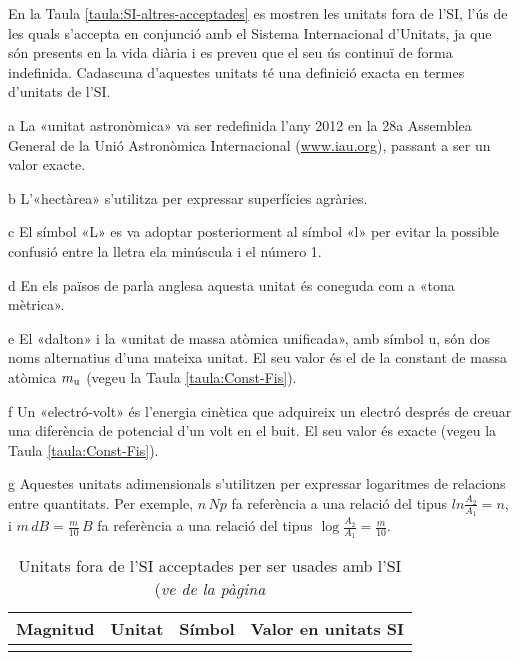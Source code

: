 En la Taula \vref{taula:SI-altres-acceptades} es mostren les unitats fora de l'SI, l'ús de les quals s'accepta en conjunció amb el Sistema Internacional d'Unitats, ja que són presents en la vida diària i es preveu que el seu ús continuï de forma indefinida. Cadascuna d'aquestes unitats té una definició exacta en termes d'unitats de l'SI.

\begin{ThreePartTable}
\begin{TableNotes}
    \item[a] {\footnotesize La «unitat astronòmica» va ser redefinida l'any 2012 en la 28a Assemblea General de la Unió Astronòmica Internacional (\href{http://www.iau.org/}{www.iau.org}), passant a ser un valor exacte.}
    \item[b] {\footnotesize L'«hectàrea» s'utilitza per expressar superfícies agràries.}
    \item[c] {\footnotesize El símbol «L» es va adoptar posteriorment al símbol «l» per evitar la possible confusió entre la lletra ela minúscula i  el número 1.}
    \item[d] {\footnotesize En els països de parla anglesa aquesta unitat és coneguda com a «tona mètrica».}
    \item[e] {\footnotesize El «dalton» i la «unitat de massa atòmica unificada», amb símbol u,  són dos noms alternatius d'una mateixa unitat. El seu valor és el de la constant de massa atòmica  $m_\mathrm{u}$ (vegeu la Taula \vref{taula:Const-Fis}).}
    \item[f] {\footnotesize Un «electró-volt» és l'energia cinètica que adquireix un electró després de creuar una diferència de potencial d'un volt en el buit. El seu valor és exacte (vegeu la Taula \vref{taula:Const-Fis}).}
    \item[g] {\footnotesize Aquestes unitats adimensionals s'utilitzen per expressar logaritmes de relacions entre quantitats. Per exemple, $n\si{\,Np}$ fa referència a una relació del tipus $ln\frac{A_2}{A_1}= n$, i  $ m\si{\,dB} =\frac{m}{10}\si{\,B}$  fa referència a una relació del tipus $\log\frac{A_2}{A_1} =\frac{m}{10}$.}
\end{TableNotes}
\begin{longtable}[h]{llcl}
   \caption{\label{taula:SI-altres-acceptades} Unitats fora de l'SI acceptades per a ser usades amb l'SI  }\\
   \toprule[1pt]
    Magnitud & Unitat &  Símbol & Valor en unitats SI\\
   \midrule
   \endfirsthead
   \caption[]{Unitats fora de l'SI acceptades per ser usades amb l'SI (\emph{ve de la pàgina
}}
\end{longtable}
\end{ThreePartTable}
